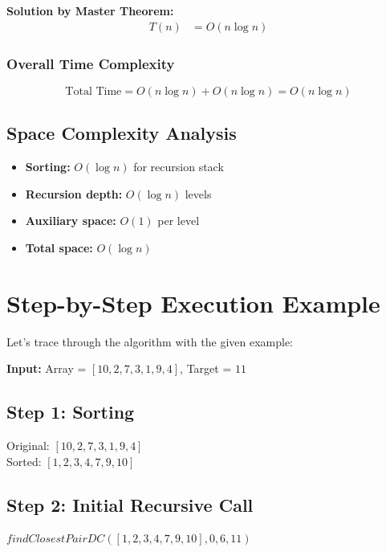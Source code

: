 \documentclass[12pt,a4paper]{article}
\begin{document}
\textbf{Solution by Master Theorem:}
\begin{align}
T(n) &= O(n \log n)
\end{align}

\subsubsection{Overall Time Complexity}
\[
\text{Total Time} = O(n \log n) + O(n \log n) = O(n \log n)
\]

\subsection{Space Complexity Analysis}

\begin{itemize}
    \item \textbf{Sorting:} $O(\log n)$ for recursion stack
    \item \textbf{Recursion depth:} $O(\log n)$ levels
    \item \textbf{Auxiliary space:} $O(1)$ per level
    \item \textbf{Total space:} $O(\log n)$
\end{itemize}

\section{Step-by-Step Execution Example}

Let's trace through the algorithm with the given example:

\textbf{Input:} Array = $[10, 2, 7, 3, 1, 9, 4]$, Target = $11$

\subsection{Step 1: Sorting}
Original: $[10, 2, 7, 3, 1, 9, 4]$\\
Sorted: $[1, 2, 3, 4, 7, 9, 10]$

\subsection{Step 2: Initial Recursive Call}
$findClosestPairDC([1, 2, 3, 4, 7, 9, 10], 0, 6, 11)$

\begin{center}
\end{center}
\end{document}
